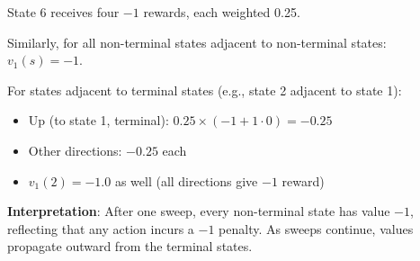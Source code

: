 \documentclass[11pt,a4paper]{article}
\begin{document}
\begin{tcolorbox}[colback=blue!5!white,colframe=blue!75!black,title=\textbf{Worked Example 25: Gridworld Policy Evaluation}]
State 6 receives four $-1$ rewards, each weighted 0.25.

Similarly, for all non-terminal states adjacent to non-terminal states: $v_1(s) = -1$.

For states adjacent to terminal states (e.g., state 2 adjacent to state 1):
\begin{itemize}
    \item Up (to state 1, terminal): $0.25 \times (-1 + 1 \cdot 0) = -0.25$
    \item Other directions: $-0.25$ each
    \item $v_1(2) = -1.0$ as well (all directions give $-1$ reward)
\end{itemize}

\textbf{Interpretation}: After one sweep, every non-terminal state has value $-1$, reflecting that any action incurs a $-1$ penalty. As sweeps continue, values propagate outward from the terminal states.
\end{tcolorbox}
\end{document}
